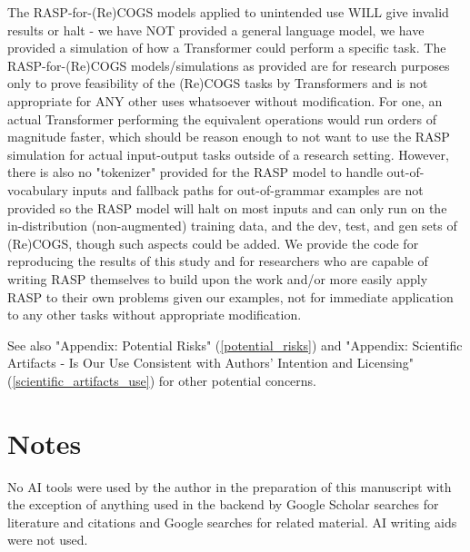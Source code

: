 \documentclass[11pt]{article}
\begin{document}
The RASP-for-(Re)COGS models applied to unintended use WILL give invalid results or halt - we have NOT provided a general language model, we have provided a simulation of how a Transformer could perform a specific task.
The RASP-for-(Re)COGS models/simulations as provided are for research purposes only to prove feasibility of the (Re)COGS tasks by Transformers and is not appropriate for ANY other uses whatsoever without modification. For one, an actual Transformer performing the equivalent operations would run orders of magnitude faster, which should be reason enough to not want to use the RASP simulation for actual input-output tasks outside of a research setting. However, there is also no "tokenizer" provided for the RASP model to handle out-of-vocabulary inputs and fallback paths for out-of-grammar examples are not provided so the RASP model will halt on most inputs and can only run on the in-distribution (non-augmented) training data, and the dev, test, and gen sets of (Re)COGS, though such aspects could be added. We provide the code for reproducing the results of this study and for researchers who are capable of writing RASP themselves to build upon the work and/or more easily apply RASP to their own problems given our examples, not for immediate application to any other tasks without appropriate modification.

See also "Appendix: Potential Risks" (\ref{potential_risks}) and "Appendix: Scientific Artifacts - Is Our Use Consistent with Authors' Intention and Licensing" (\ref{scientific_artifacts_use}) for other potential concerns.



\section*{Notes}
No AI tools were used by the author in the preparation of this manuscript with the exception of anything used in the backend by Google Scholar searches for literature and citations and Google searches for related material. AI writing aids were not used.
\end{document}
